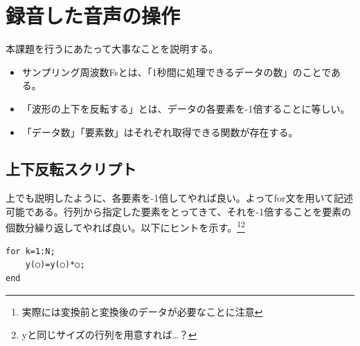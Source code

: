 \section{録音した音声の操作}
本課題を行うにあたって大事なことを説明する。
\begin{itemize}
\item サンプリング周波数Fsとは、「1秒間に処理できるデータの数」のことである。
\item 「波形の上下を反転する」とは、データの各要素を-1倍することに等しい。
\item 「データ数」「要素数」はそれぞれ取得できる関数が存在する。
\end{itemize}

\subsection{上下反転スクリプト}
上でも説明したように、各要素を-1倍してやれば良い。よってfor文を用いて記述可能である。行列から指定した要素をとってきて、それを-1倍することを要素の個数分繰り返してやれば良い。以下にヒントを示す。\footnote{実際には変換前と変換後のデータが必要なことに注意}\footnote{yと同じサイズの行列を用意すれば…？}
\begin{verbatim}
for k=1:N;
    y(○)=y(○)*○;
end
\end{verbatim}


